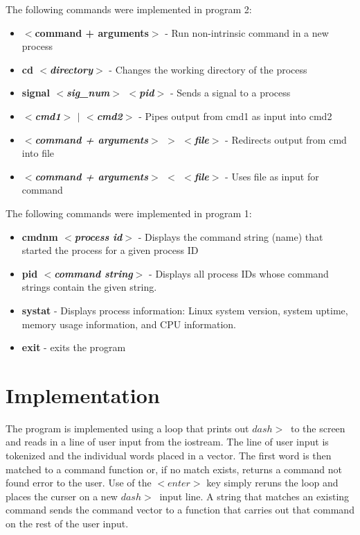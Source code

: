 \documentclass{article}
\begin{document}
The following commands were implemented in program 2:
\begin{itemize}
\item \textbf{$<$command + arguments$>$} - Run non-intrinsic command in a new process
\item \textbf{cd $<$\textit{directory}$>$} - Changes the working directory of the process
\item \textbf{signal $<$\textit{sig\_num}$>$ $<$\textit{pid}$>$} - Sends a signal to a process
\item \textbf{$<$\textit{cmd1}$>$ $|$ $<$\textit{cmd2}$>$} - Pipes output from cmd1 as input into cmd2
\item \textbf{$<$\textit{command + arguments}$>$ $>$ $<$\textit{file}$>$} - Redirects output from cmd into file
\item \textbf{$<$\textit{command + arguments}$>$ $<$ $<$\textit{file}$>$} - Uses file as input for command\\
\end{itemize}

The following commands were implemented in program 1:
\begin{itemize}
\item \textbf{cmdnm $<$\textit{process id}$>$} - Displays the command string (name) that started the process for a given process ID
\item \textbf{pid \textit{$<$command string$>$}} - Displays all process IDs whose command strings contain the given string.
\item \textbf{systat} - Displays process information: Linux system version, system uptime, memory usage information, and CPU information.
\item \textbf{exit} - exits the program
\end{itemize}

\section{Implementation}
The program is implemented using a loop that prints out $dash>\ $ to the screen and reads in a line of user input from the iostream.  The line of user input is tokenized and the individual words placed in a vector. The first word is then matched to a command function or, if no match exists, returns a command not found error to the user.  Use of the $<enter>$ key simply reruns the loop and places the curser on a new $dash>\ $ input line.  A string that matches an existing command sends the command vector to a function that carries out that command on the rest of the user input.\\
\end{document}
